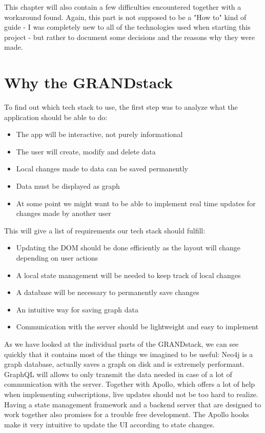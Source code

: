 This chapter will also contain a few difficulties encountered together with a workaround found. Again, this part is not supposed to be a "How to" kind of guide - I was completely new to all of the technologies used when starting this project - but rather to document some decisions and the reasons why they were made.

\section{Why the GRANDstack}
To find out which tech stack to use, the first step was to analyze what the application should be able to do:
\begin{itemize}
\item The app will be interactive, not purely informational
\item The user will create, modify and delete data
\item Local changes made to data can be saved permanently
\item Data must be displayed as graph
\item At some point we might want to be able to implement real time updates for changes made by another user
\end{itemize}
This will give a list of requirements our tech stack should fulfill:
\begin{itemize}
\item Updating the DOM should be done efficiently as the layout will change depending on user actions
\item A local state management will be needed to keep track of local changes
\item A database will be necessary to permanently save changes
\item An intuitive way for saving graph data
\item Communication with the server should be lightweight and easy to implement
\end{itemize}

As we have looked at the individual parts of the GRANDstack, we can see quickly that it contains most of the things we imagined to be useful: Neo4j is a graph database, actually saves a graph on disk and is extremely performant. GraphQL will allows to only transmit the data needed in case of a lot of communication with the server. Together with Apollo, which offers a lot of help when implementing subscriptions, live updates should not be too hard to realize. Having a state management framework and a backend server that are designed to work together also promises for a trouble free development. The Apollo hooks make it very intuitive to update the UI according to state changes.

